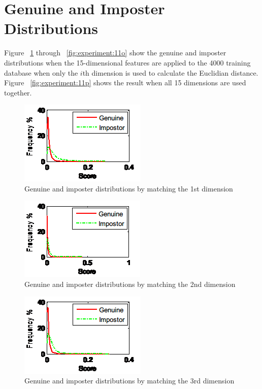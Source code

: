 \section{Genuine and Imposter Distributions}
\label{sec:experiment:distribution}

Figure ~\ref{fig:experiment:11a} through ~\ref{fig:experiment:11o} show the genuine and imposter distributions when the 15-dimensional features are applied to the 4000 training database when only the $i$th dimension is used to calculate the Euclidian distance. Figure ~\ref{fig:experiment:11p} shows the result when all 15 dimensions are used together.

\begin{figure}[htb]
  \begin{center}
    \includegraphics[scale=1]{ch-experiment/figures/11a}
    \caption{Genuine and imposter distributions by matching the 1st dimension}
    \label{fig:experiment:11a}
  \end{center}
\end{figure}

\begin{figure}[htb]
  \begin{center}
    \includegraphics[scale=1]{ch-experiment/figures/11b}
    \caption{Genuine and imposter distributions by matching the 2nd dimension}
    \label{fig:experiment:11b}
  \end{center}
\end{figure}

\begin{figure}[htb]
  \begin{center}
    \includegraphics[scale=1]{ch-experiment/figures/11c}
    \caption{Genuine and imposter distributions by matching the 3rd dimension}
    \label{fig:experiment:11c}
  \end{center}
\end{figure}

